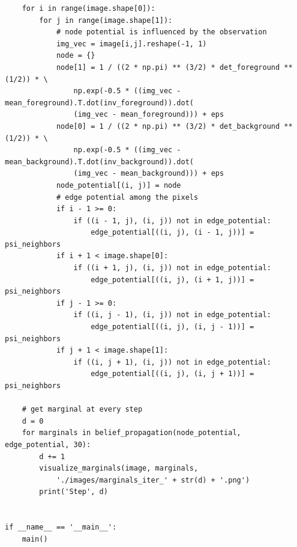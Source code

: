 \documentclass{article}
\begin{document}
\begin{lstlisting}
    for i in range(image.shape[0]):
        for j in range(image.shape[1]):
            # node potential is influenced by the observation
            img_vec = image[i,j].reshape(-1, 1)
            node = {}
            node[1] = 1 / ((2 * np.pi) ** (3/2) * det_foreground ** (1/2)) * \
                np.exp(-0.5 * ((img_vec - mean_foreground).T.dot(inv_foreground)).dot(
                (img_vec - mean_foreground))) + eps
            node[0] = 1 / ((2 * np.pi) ** (3/2) * det_background ** (1/2)) * \
                np.exp(-0.5 * ((img_vec - mean_background).T.dot(inv_background)).dot(
                (img_vec - mean_background))) + eps
            node_potential[(i, j)] = node
            # edge potential among the pixels
            if i - 1 >= 0:
                if ((i - 1, j), (i, j)) not in edge_potential:
                    edge_potential[((i, j), (i - 1, j))] = psi_neighbors
            if i + 1 < image.shape[0]:
                if ((i + 1, j), (i, j)) not in edge_potential:
                    edge_potential[((i, j), (i + 1, j))] = psi_neighbors
            if j - 1 >= 0:
                if ((i, j - 1), (i, j)) not in edge_potential:
                    edge_potential[((i, j), (i, j - 1))] = psi_neighbors
            if j + 1 < image.shape[1]:
                if ((i, j + 1), (i, j)) not in edge_potential:
                    edge_potential[((i, j), (i, j + 1))] = psi_neighbors

    # get marginal at every step
    d = 0
    for marginals in belief_propagation(node_potential, edge_potential, 30):
        d += 1
        visualize_marginals(image, marginals,
            './images/marginals_iter_' + str(d) + '.png')
        print('Step', d)


if __name__ == '__main__':
    main()
\end{lstlisting}
\end{document}
